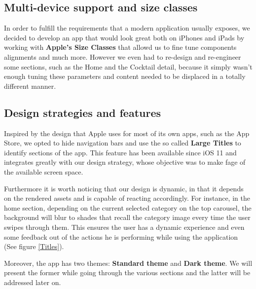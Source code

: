 \documentclass[paper=a4, fontsize=12pt]{scrartcl}
\numberwithin{equation}{section}		%
\numberwithin{figure}{section}			%
\numberwithin{table}{section}				%
\begin{document}
\subsection{Multi-device support and size classes}

In order to fulfill the requirements that a modern application usually exposes, we decided to develop an app that would look great both on iPhones and iPads by working with \textbf{Apple's Size Classes} that allowd us to fine tune components alignments and much more. However we even had to re-design and re-engineer some sections, such as the Home and the Cocktail detail, because it simply wasn't enough tuning these parameters and content needed to be displaced in a totally different manner. 


\subsection{Design strategies and features}

Inspired by the design
 that Apple uses for most of its own apps, such as the App Store, we opted to hide navigation bars and use the so called \textbf{Large Titles} to identify sections of the app. This feature has been available since iOS 11 and integrates greatly with our design strategy, whose objective was to make fage of the available screen space.

Furthermore it is worth noticing that our design is dynamic, in that it depends on the rendered assets and is capable of reacting accordingly. For instance, in the home section, depending on the current selected category on the top carousel, the background will blur to shades that recall the category image every time the user swipes through them. This ensures the user has a dynamic experience and even some feedback out of the actions he is performing while using the application (See figure \ref{Titles}).


Moreover, the app has two themes: \textbf{Standard theme} and \textbf{Dark theme}. We will present the former while going through the various sections and the latter will be addressed later on.
\end{document}
